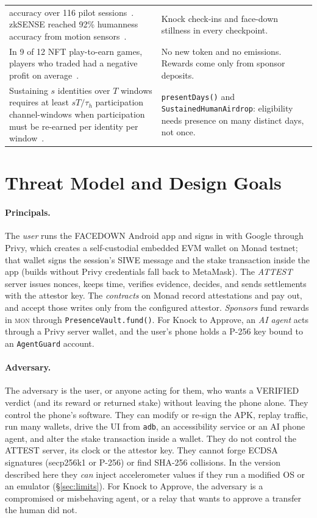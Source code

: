 \documentclass[10pt]{article}
\newcommand{\code}[1]{\texttt{\small #1}}
\newcommand{\mon}{\textsc{mon}}
\begin{document}
\begin{table}[h]
\begin{tabularx}{\linewidth}{@{}X X@{}}
accuracy over 116 pilot sessions~\cite{liu2026}. zkSENSE reached 92\% humanness accuracy from motion sensors~\cite{zksense}. &
Knock check-ins and face-down stillness in every checkpoint. \\
In 9 of 12 NFT play-to-earn games, players who traded had a negative profit on average~\cite{gao2026}. &
No new token and no emissions. Rewards come only from sponsor deposits. \\
Sustaining $s$ identities over $T$ windows requires at least $sT/\tau_h$ participation channel-windows when
participation must be re-earned per identity per window~\cite{bpc2026}. &
\code{presentDays()} and \code{SustainedHumanAirdrop}: eligibility needs presence on many distinct days, not once. \\\bottomrule
\end{tabularx}
\end{table}

\section{Threat Model and Design Goals}\label{sec:threat}

\paragraph{Principals.} The \emph{user} runs the FACEDOWN Android app and signs in with Google through Privy, which
creates a self-custodial embedded EVM wallet on Monad testnet; that wallet signs the session's SIWE message and the stake
transaction inside the app (builds without Privy credentials fall back to MetaMask). The \emph{ATTEST} server issues
nonces, keeps time, verifies evidence, decides, and sends settlements with the attestor key. The \emph{contracts} on
Monad record attestations and pay out, and accept those writes only from the configured attestor. \emph{Sponsors} fund
rewards in \mon{} through \code{PresenceVault.fund()}. For Knock to Approve, an \emph{AI agent} acts through a Privy
server wallet, and the user's phone holds a P-256 key bound to an \code{AgentGuard} account.

\paragraph{Adversary.} The adversary is the user, or anyone acting for them, who wants a VERIFIED verdict (and its
reward or returned stake) without leaving the phone alone. They control the phone's software. They can modify or
re-sign the APK, replay traffic, run many wallets, drive the UI from \code{adb}, an accessibility service or an AI phone
agent, and alter the stake transaction inside a wallet. They do not control the ATTEST server, its clock or the attestor
key. They cannot forge ECDSA signatures (secp256k1 or P-256) or find SHA-256 collisions. In the version described here
they \emph{can} inject accelerometer values if they run a modified OS or an emulator (\S\ref{sec:limits}). For Knock to
Approve, the adversary is a compromised or misbehaving agent, or a relay that wants to approve a transfer the human did
not.
\end{document}
